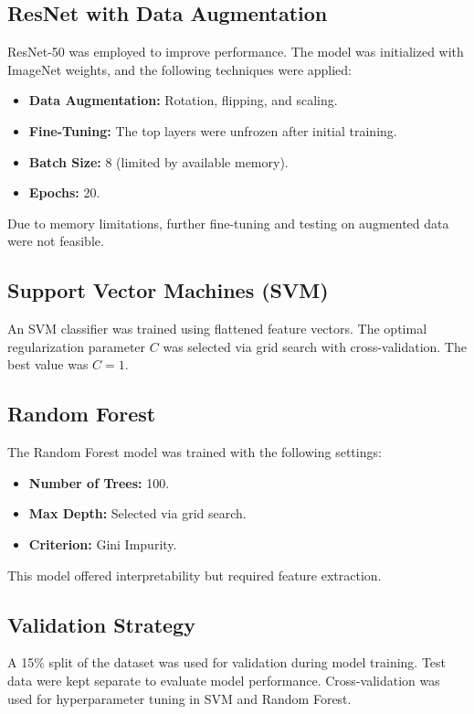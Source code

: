 \documentclass[runningheads]{llncs}
\begin{document}
\subsection{ResNet with Data Augmentation}
ResNet-50 was employed to improve performance. The model was initialized with ImageNet weights, and the following techniques were applied:
\begin{itemize}
    \item \textbf{Data Augmentation:} Rotation, flipping, and scaling.
    \item \textbf{Fine-Tuning:} The top layers were unfrozen after initial training.
    \item \textbf{Batch Size:} 8 (limited by available memory).
    \item \textbf{Epochs:} 20.
\end{itemize}
Due to memory limitations, further fine-tuning and testing on augmented data were not feasible.

\subsection{Support Vector Machines (SVM)}
An SVM classifier was trained using flattened feature vectors. The optimal regularization parameter \(C\) was selected via grid search with cross-validation. The best value was \(C=1\).

\subsection{Random Forest}
The Random Forest model was trained with the following settings:
\begin{itemize}
    \item \textbf{Number of Trees:} 100.
    \item \textbf{Max Depth:} Selected via grid search.
    \item \textbf{Criterion:} Gini Impurity.
\end{itemize}
This model offered interpretability but required feature extraction.

\subsection{Validation Strategy}
A 15\% split of the dataset was used for validation during model training. Test data were kept separate to evaluate model performance. Cross-validation was used for hyperparameter tuning in SVM and Random Forest.
\end{document}
